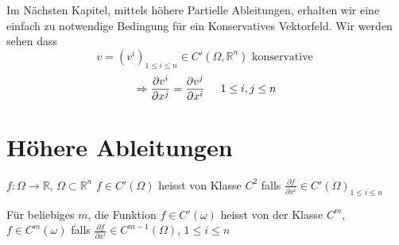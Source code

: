 Im Nächsten Kapitel, mittels höhere Partielle Ableitungen, erhalten wir eine einfach zu  notwendige Bedingung für ein Konservatives Vektorfeld. Wir werden sehen dass
\[v = {\left( {{v^i}} \right)_{1 \le i \le n}} \in C'\left( {\Omega ,\mathbb{R}^n} \right)\text{ konservative }\]
$$\Rightarrow \frac{\partial v^i}{\partial x^j}=\frac{\partial v^j}{\partial x^i}\hspace{5mm}1\leq i,j\leq n$$

\section{Höhere Ableitungen}
\begin{definition}{8.44}
$f:\Omega\rightarrow\mathbb{R}$, $\Omega\subset\mathbb{R}^n$ $f\in C'\left( \Omega\right)$ heisst von Klasse $C^2$ falls $\frac{\partial f}{\partial x^i}\in C'{\left( \Omega\right)}_{1\leq i\leq n}$
\end{definition}
Für beliebiges $m$, die Funktion $f\in C'\left( \omega\right)$ heisst von der Klasse $C^m$, $f\in C^m\left( \omega\right)$ falls $\frac{\partial f}{\partial x^i}\in C^{m-1}\left( \Omega\right)$, $1\leq i\leq n$\\

